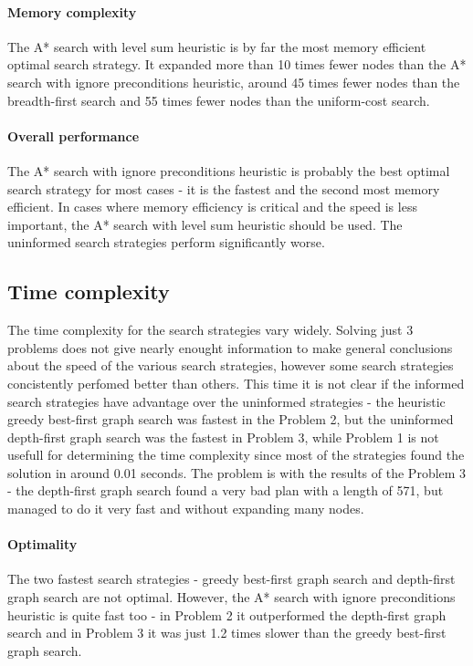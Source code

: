 \documentclass[11pt]{article}
\begin{document}
\paragraph{Memory complexity}

The A* search with level sum heuristic is by far the most memory efficient optimal search strategy. It expanded more than 10 times fewer nodes than the A* search with ignore preconditions heuristic, around 45 times fewer nodes than the breadth-first search and 55 times fewer nodes than the uniform-cost search.

\paragraph{Overall performance}

The A* search with ignore preconditions heuristic is probably the best optimal search strategy for most cases - it is the fastest and the second most memory efficient. In cases where memory efficiency is critical and the speed is less important, the A* search with level sum heuristic should be used. The uninformed search strategies perform significantly worse.

\subsection{Time complexity}

The time complexity for the search strategies vary widely. Solving just 3 problems does not give nearly enought information to make general conclusions about the speed of the various search strategies, however some search strategies concistently perfomed better than others. This time it is not clear if the informed search strategies have advantage over the uninformed strategies - the heuristic greedy best-first graph search was fastest in the Problem 2, but the uninformed depth-first graph search was the fastest in Problem 3, while Problem 1 is not usefull for determining the time complexity since most of the strategies found the solution in around 0.01 seconds. The problem is with the results of the Problem 3 - the depth-first graph search found a very bad plan with a length of 571, but managed to do it very fast and without expanding many nodes.

\paragraph{Optimality}

The two fastest search strategies - greedy best-first graph search and depth-first graph search are not optimal. However, the A* search with ignore preconditions heuristic is quite fast too - in Problem 2 it outperformed the depth-first graph search and in Problem 3 it was just 1.2 times slower than the greedy best-first graph search. 
\end{document}
